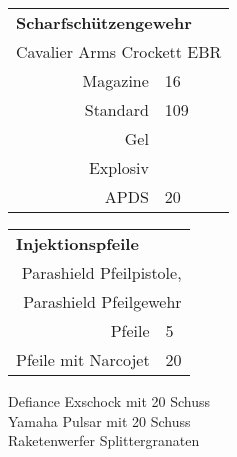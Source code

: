 {\begin{tabular}[]{r | l}
	\multicolumn{2}{l}{\textbf{Scharfschützengewehr}}\\
	\multicolumn{2}{r}{Cavalier Arms Crockett EBR}\\
	\hline
	Magazine & 16 \\
	\hline
	Standard & 109 \\
	Gel &  \\
	Explosiv &  \\
	APDS & 20 \\
	\hline
\end{tabular}
\begin{tabular}[]{r | l}
	\multicolumn{2}{l}{\textbf{Injektionspfeile}}\\
	\multicolumn{2}{r}{Parashield Pfeilpistole,}\\
	\multicolumn{2}{r}{Parashield Pfeilgewehr}\\
	\hline
	Pfeile & 5 \\
	Pfeile mit Narcojet & 20 \\
	\hline
\end{tabular}

Defiance Exschock mit 20 Schuss \\
Yamaha Pulsar mit 20 Schuss \\
Raketenwerfer Splittergranaten

\begin{multicols}{2}


\end{multicols}}
